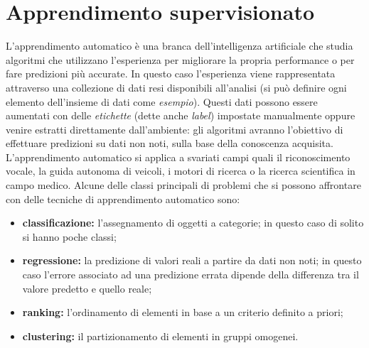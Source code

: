 \documentclass[oneside, openany]{book}
\begin{document}
		\section{Apprendimento supervisionato}
		L'apprendimento automatico è una branca dell'intelligenza artificiale che studia algoritmi che utilizzano l'esperienza per migliorare la propria performance o per fare predizioni più accurate. In questo caso l'esperienza viene rappresentata attraverso una collezione di dati resi disponibili all'analisi (si può definire ogni elemento dell'insieme di dati come \textit{esempio}). Questi dati possono essere aumentati con delle \textit{etichette} (dette anche \textit{label}) impostate manualmente oppure venire estratti direttamente dall'ambiente: gli algoritmi avranno l'obiettivo di effettuare predizioni su dati non noti, sulla base della conoscenza acquisita.
		L'apprendimento automatico si applica a svariati campi quali il riconoscimento vocale, la guida autonoma di veicoli, i motori di ricerca o la ricerca scientifica in campo medico. Alcune delle classi principali di problemi che si possono affrontare con delle tecniche di apprendimento automatico sono:
		\begin{itemize}
			\item\textbf{classificazione:} l'assegnamento di oggetti a categorie; in questo caso di solito si hanno poche classi;
			\item\textbf{regressione:} la predizione di valori reali a partire da dati non noti; in questo caso l'errore associato ad una predizione errata dipende della differenza tra il valore predetto e quello reale;
			\item\textbf{ranking:} l'ordinamento di elementi in base a un criterio definito a priori;
			\item\textbf{clustering:} il partizionamento di elementi in gruppi omogenei.
		\end{itemize}
	
\end{document}
